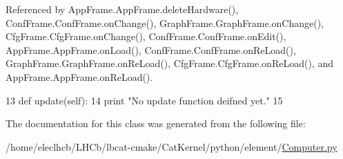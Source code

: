 Referenced by App\+Frame.\+App\+Frame.\+delete\+Hardware(), Conf\+Frame.\+Conf\+Frame.\+on\+Change(), Graph\+Frame.\+Graph\+Frame.\+on\+Change(), Cfg\+Frame.\+Cfg\+Frame.\+on\+Change(), Conf\+Frame.\+Conf\+Frame.\+on\+Edit(), App\+Frame.\+App\+Frame.\+on\+Load(), Conf\+Frame.\+Conf\+Frame.\+on\+Re\+Load(), Graph\+Frame.\+Graph\+Frame.\+on\+Re\+Load(), Cfg\+Frame.\+Cfg\+Frame.\+on\+Re\+Load(), and App\+Frame.\+App\+Frame.\+on\+Re\+Load().


\begin{DoxyCode}
13     \textcolor{keyword}{def }update(self):
14         \textcolor{keywordflow}{print} \textcolor{stringliteral}{"No update function deifned yet."}
15 
\end{DoxyCode}


The documentation for this class was generated from the following file\+:\begin{DoxyCompactItemize}
\item 
/home/eleclhcb/\+L\+H\+Cb/lbcat-\/cmake/\+Cat\+Kernel/python/element/\hyperlink{Computer_8py}{Computer.\+py}\end{DoxyCompactItemize}
